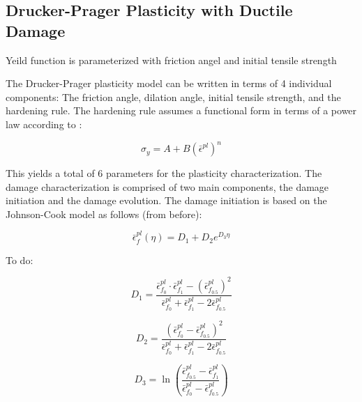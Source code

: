 \subsection{Drucker-Prager Plasticity with Ductile Damage}
Yeild function is parameterized with friction angel and initial tensile strength

The Drucker-Prager plasticity model can be written in terms of 4 individual
components: The friction angle, dilation angle, initial tensile strength,
and the hardening rule. The hardening rule assumes a functional form
in terms of a power law according to \cite{prantl_identification_2013}:

\begin{equation}
\sigma_{y}=A+B\left(\bar{\epsilon}^{pl}\right)^{n}\label{eqn:dparam5}
\end{equation}

This yields a total of 6 parameters for the plasticity characterization.
The damage characterization is comprised of two main components, the
damage initiation and the damage evolution. The damage initiation
is based on the Johnson-Cook model as follows (from before):

\begin{equation}
\bar{\epsilon}_{f}^{pl}\left(\eta\right)=D_{1}+D_{2}e^{D_{3}\eta}\label{eqn:dparam6}
\end{equation}


To do:

\begin{equation}
D_1=\frac{\bar{\epsilon}^{pl}_{f_0}\cdot \bar{\epsilon}^{pl}_{f_1}-\left ( \bar{\epsilon}^{pl}_{f_{0.5}} \right )^2}{\bar{\epsilon}^{pl}_{f_0}+ \bar{\epsilon}^{pl}_{f_1}-2\bar{\epsilon}^{pl}_{f_{0.5}}}
\label{eqn:dparam7}
\end{equation}

\begin{equation}
D_2=\frac{\left (\bar{\epsilon}^{pl}_{f_0}- \bar{\epsilon}^{pl}_{f_{0.5}} \right )^2}{\bar{\epsilon}^{pl}_{f_0}+ \bar{\epsilon}^{pl}_{f_1}-2\bar{\epsilon}^{pl}_{f_{0.5}}}
\label{eqn:dparam8}
\end{equation}

\begin{equation}
D_3=\ln \left (\frac{\bar{\epsilon}^{pl}_{f_{0.5}}-\bar{\epsilon}^{pl}_{f_1}}{\bar{\epsilon}^{pl}_{f_0} -\bar{\epsilon}^{pl}_{f_{0.5}}}\right )
\label{eqn:dparam9}
\end{equation}


